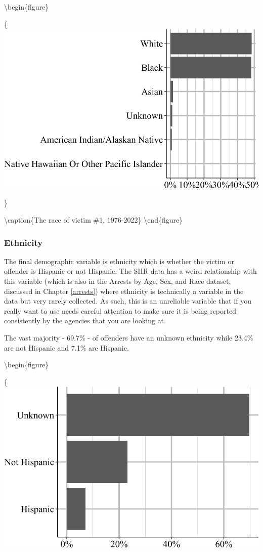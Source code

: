 \documentclass[
  12pt,
  openany]{book}
\begin{document}
\textbackslash begin\{figure\}

\{\centering \includegraphics[width=0.9\linewidth]{06_shr_files/figure-latex/shrVictimRace-1}

\}

\textbackslash caption\{The race of victim \#1, 1976-2022\}\label{fig:shrVictimRace}
\textbackslash end\{figure\}

\subsubsection{Ethnicity}\label{ethnicity-1}

The final demographic variable is ethnicity which is whether the victim or offender is Hispanic or not Hispanic. The SHR data has a weird relationship with this variable (which is also in the Arrests by Age, Sex, and Race dataset, discussed in Chapter \ref{arrests}) where ethnicity is technically a variable in the data but very rarely collected. As such, this is an unreliable variable that if you really want to use needs careful attention to make sure it is being reported consistently by the agencies that you are looking at.

The vast majority - 69.7\% - of offenders have an unknown ethnicity while 23.4\% are not Hispanic and 7.1\% are Hispanic.

\textbackslash begin\{figure\}

\{\centering \includegraphics[width=0.9\linewidth]{06_shr_files/figure-latex/shrOffenderEthnicity-1}
\end{document}
